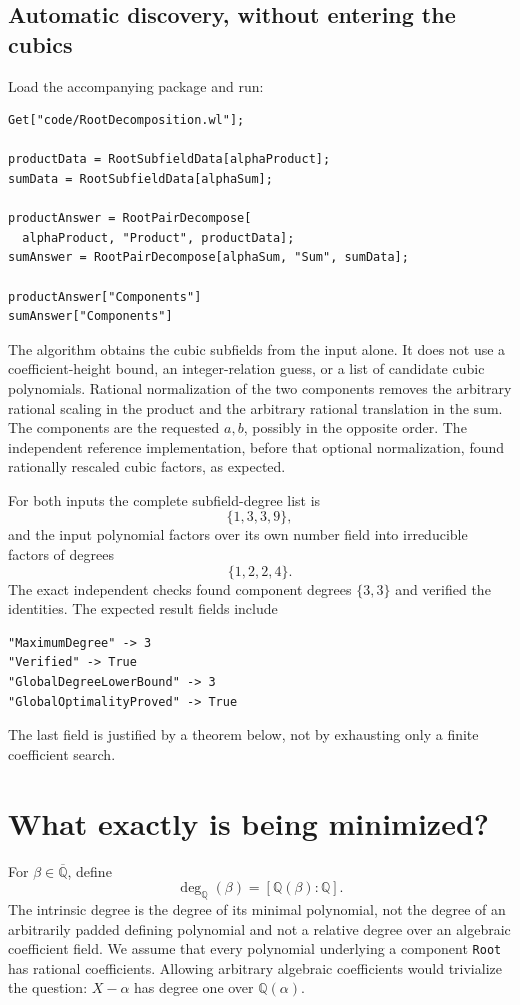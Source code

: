 \documentclass[11pt,a4paper]{article}
\newcommand{\Q}{\mathbb Q}
\newcommand{\Qbar}{\overline{\mathbb Q}}
\newcommand{\degQ}{\operatorname{deg}_{\Q}}
\newcommand{\code}[1]{\texttt{#1}}
\theoremstyle{remark}\newtheorem{remark}[theorem]{Remark}
\begin{document}
\subsection{Automatic discovery, without entering the cubics}
Load the accompanying package and run:
\begin{lstlisting}
Get["code/RootDecomposition.wl"];

productData = RootSubfieldData[alphaProduct];
sumData = RootSubfieldData[alphaSum];

productAnswer = RootPairDecompose[
  alphaProduct, "Product", productData];
sumAnswer = RootPairDecompose[alphaSum, "Sum", sumData];

productAnswer["Components"]
sumAnswer["Components"]
\end{lstlisting}
The algorithm obtains the cubic subfields from the input alone. It does not use a coefficient-height bound, an integer-relation guess, or a list of candidate cubic polynomials. Rational normalization of the two components removes the arbitrary rational scaling in the product and the arbitrary rational translation in the sum. The components are the requested $a,b$, possibly in the opposite order. The independent reference implementation, before that optional normalization, found rationally rescaled cubic factors, as expected.

For both inputs the complete subfield-degree list is
\[
 \{1,3,3,9\},
\]
and the input polynomial factors over its own number field into irreducible factors of degrees
\[
 \{1,2,2,4\}.
\]
The exact independent checks found component degrees $\{3,3\}$ and verified the identities. The expected result fields include
\begin{lstlisting}
"MaximumDegree" -> 3
"Verified" -> True
"GlobalDegreeLowerBound" -> 3
"GlobalOptimalityProved" -> True
\end{lstlisting}
The last field is justified by a theorem below, not by exhausting only a finite coefficient search.

\section{What exactly is being minimized?}
\label{sec:problem}
For $\beta\in\Qbar$, define
\[
 \degQ(\beta)=[\Q(\beta):\Q].
\]
The intrinsic degree is the degree of its minimal polynomial, not the degree of an arbitrarily padded defining polynomial and not a relative degree over an algebraic coefficient field. We assume that every polynomial underlying a component \code{Root} has rational coefficients. Allowing arbitrary algebraic coefficients would trivialize the question: $X-\alpha$ has degree one over $\Q(\alpha)$.
\end{document}
